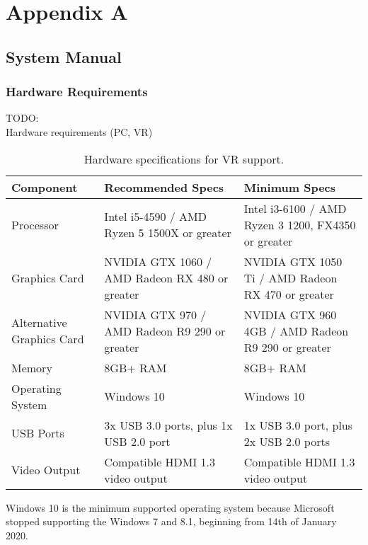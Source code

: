 \section*{Appendix A}
\subsection*{System Manual}

\subsubsection*{Hardware Requirements}

TODO: \\

Hardware requirements (PC, VR) \\

\begin{table}[!ht]
	\centering\footnotesize
	\begin{tabular}{ |p{4cm}||p{5.1cm}|p{5.1cm}|  }
		\hline
		Component & Recommended Specs & Minimum Specs \\
		\hline
		Processor & Intel i5-4590 / AMD Ryzen 5 1500X or greater & Intel i3-6100 / AMD Ryzen 3 1200, FX4350 or greater  \\
		Graphics Card & NVIDIA GTX 1060 / AMD Radeon RX 480 or greater & NVIDIA GTX 1050 Ti / AMD Radeon RX 470 or greater  \\
		Alternative Graphics Card & NVIDIA GTX 970 / AMD Radeon R9 290 or greater & NVIDIA GTX 960 4GB / AMD Radeon R9 290 or greater  \\
		Memory & 8GB+ RAM & 8GB+ RAM  \\
		Operating System & Windows 10 & Windows 10  \\
		USB Ports & 3x USB 3.0 ports, plus 1x USB 2.0 port & 1x USB 3.0 port, plus 2x USB 2.0 ports  \\
		Video Output & 	Compatible HDMI 1.3 video output & Compatible HDMI 1.3 video output  \\
		\hline
	\end{tabular}
	\caption{Hardware specifications for VR support.}
	\label{tab:vr-specs}
\end{table}

Windows 10 is the minimum supported operating system because Microsoft stopped supporting the Windows 7 and 8.1, beginning from 14th of January 2020.